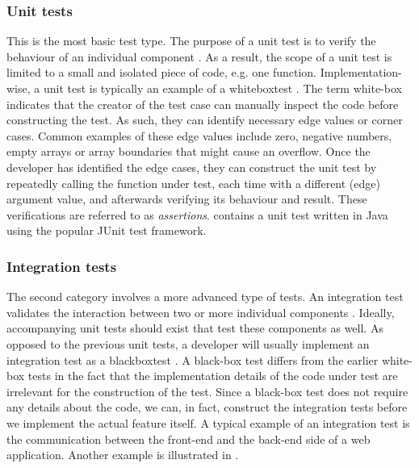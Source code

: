 \subsubsection{Unit tests}
This is the most basic test type. The purpose of a unit test is to verify the behaviour of an individual component \cite{whittaker2000}. As a result, the scope of a unit test is limited to a small and isolated piece of code, e.g. one function. Implementation-wise, a unit test is typically an example of a \gls{whiteboxtest} \cite[p.~12]{6588537}. The term white-box indicates that the creator of the test case can manually inspect the code before constructing the test. As such, they can identify necessary edge values or corner cases. Common examples of these edge values include zero, negative numbers, empty arrays or array boundaries that might cause an overflow. Once the developer has identified the edge cases, they can construct the unit test by repeatedly calling the function under test, each time with a different (edge) argument value, and afterwards verifying its behaviour and result. These verifications are referred to as \emph{assertions}.  contains a unit test written in Java using the popular JUnit test framework.\\
	


\clearpage

\subsubsection{Integration tests}
The second category involves a more advanced type of tests. An integration test validates the interaction between two or more individual components \cite{whittaker2000}. Ideally, accompanying unit tests should exist that test these components as well. As opposed to the previous unit tests, a developer will usually implement an integration test as a \gls{blackboxtest} \cite[p.~6]{6588537}. A black-box test differs from the earlier white-box tests in the fact that the implementation details of the code under test are irrelevant for the construction of the test. Since a black-box test does not require any details about the code, we can, in fact, construct the integration tests before we implement the actual feature itself. A typical example of an integration test is the communication between the front-end and the back-end side of a web application. Another example is illustrated in .\\
	
